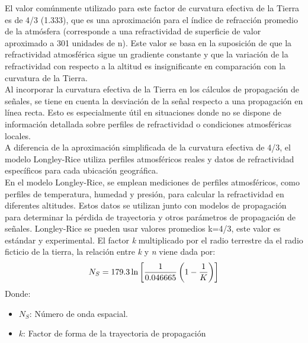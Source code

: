 \documentclass[
	12pt, %
	fleqn, %
	a4paper, %
	oneside, %
]{LegrandOrangeBook}
\begin{document}
El valor comúnmente utilizado para este factor de curvatura efectiva de la Tierra es de 4/3 (1.333), que es una aproximación para el índice de refracción promedio de la atmósfera (corresponde a una refractividad de superficie de valor aproximado a 301 unidades de n). Este valor se basa en la suposición de que la refractividad atmosférica sigue un gradiente constante y que la variación de la refractividad con respecto a la altitud es insignificante en comparación con la curvatura de la Tierra.\\
Al incorporar la curvatura efectiva de la Tierra en los cálculos de propagación de señales, se tiene en cuenta la desviación de la señal respecto a una propagación en línea recta. Esto es especialmente útil en situaciones donde no se dispone de información detallada sobre perfiles de refractividad o condiciones atmosféricas locales.\\
A diferencia de la aproximación simplificada de la curvatura efectiva de 4/3, el modelo Longley-Rice utiliza perfiles atmosféricos reales y datos de refractividad específicos para cada ubicación geográfica.\\
En el modelo Longley-Rice, se emplean mediciones de perfiles atmosféricos, como perfiles de temperatura, humedad y presión, para calcular la refractividad en diferentes altitudes. Estos datos se utilizan junto con modelos de propagación para determinar la pérdida de trayectoria y otros parámetros de propagación de señales. Longley-Rice se pueden usar valores promedios k=4/3, este valor es estándar y experimental.
El factor \textit{k} multiplicado por el radio terrestre da el radio ficticio de la tierra, la relación entre \textit{k} y \textit{n} viene dada por:
\begin{equation}
N_S=179.3\ln\left[\frac{1}{0.046665}\left(1-\frac{1}{K}\right)\right]
\end{equation}
Donde:
\begin{itemize}
\item $N_S$: Número de onda espacial.
\item $k$: Factor de forma de la trayectoria de propagación
\end{itemize}
\end{document}
